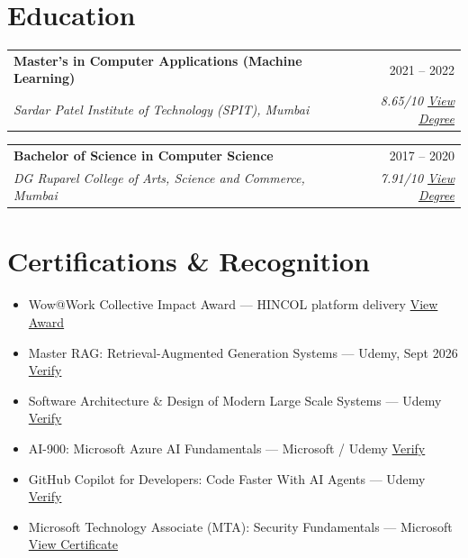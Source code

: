 \documentclass[10pt,a4paper]{article}
\makeatletter
\newcommand{\resumeSubheading}[4]{
  \vspace{1pt}
  \begin{tabularx}{\textwidth}{@{}X r@{}}
    \textbf{#1} & #2 \\
    \textit{#3} & \textit{#4}
  \end{tabularx}
  \vspace{-3pt}
}
\newcommand{\link}[2]{\href{#1}{#2}}
\makeatother
\begin{document}
\section{Education}

\resumeSubheading
  {Master's in Computer Applications (Machine Learning)}
  {2021 -- 2022}
  {Sardar Patel Institute of Technology (SPIT), Mumbai}
  {8.65/10 \quad \link{https://github.com/udit-kulkarni98/Certificates/blob/main/PGDegree_Certificate_Udit_Kulkarni_MCA.jpeg}{View Degree}}

\resumeSubheading
  {Bachelor of Science in Computer Science}
  {2017 -- 2020}
  {DG Ruparel College of Arts, Science and Commerce, Mumbai}
  {7.91/10 \quad \link{https://github.com/udit-kulkarni98/Certificates/blob/main/Graduation_Degree.jpeg}{View Degree}}

\section{Certifications \& Recognition}
\begin{itemize}
  \item Wow@Work Collective Impact Award --- HINCOL platform delivery
  \hfill \link{https://udit-kulkarni98.github.io/assets/wow@work.png}{View Award}
  \item Master RAG: Retrieval-Augmented Generation Systems --- Udemy, Sept 2026
  \hfill \link{https://www.udemy.com/certificate/UC-cb786c10-6972-4303-923e-910806378736/}{Verify}
  \item Software Architecture \& Design of Modern Large Scale Systems --- Udemy
  \hfill \link{https://www.udemy.com/certificate/UC-49d68025-9d0c-4b18-a53d-928297b06204/}{Verify}
  \item AI-900: Microsoft Azure AI Fundamentals --- Microsoft / Udemy
  \hfill \link{https://www.udemy.com/certificate/UC-870976ff-0969-4d36-89ee-fae6742af858/}{Verify}
  \item GitHub Copilot for Developers: Code Faster With AI Agents --- Udemy
  \hfill \link{https://www.udemy.com/certificate/UC-15c19ecb-5e9b-45ef-8883-c07f595696bf/}{Verify}
  \item Microsoft Technology Associate (MTA): Security Fundamentals --- Microsoft
  \hfill \link{https://github.com/udit-kulkarni98/Certificates/blob/main/MTA.pdf}{View Certificate}
\end{itemize}
\end{document}
